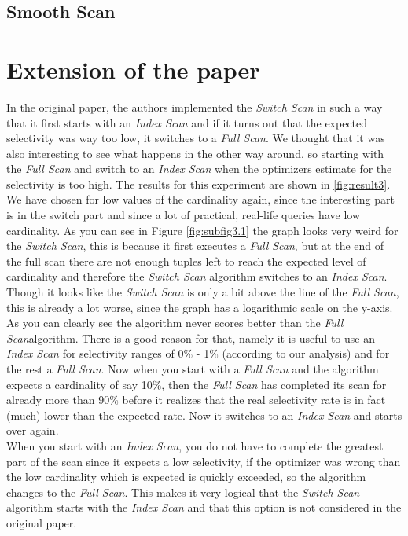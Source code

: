 \documentclass[a4paper,11pt,twoside]{article}
\begin{document}
\subsection{Smooth Scan}

\section{Extension of the paper}\label{sec:extension}
In the original paper, the authors implemented the \textit{Switch Scan} in such a way that it first starts with an \textit{Index Scan} and if it turns out that the expected selectivity was way too low, it switches to a \textit{Full Scan}. We thought that it was also interesting to see what happens in the other way around, so starting with the \textit{Full Scan} and switch to an \textit{Index Scan} when the optimizers estimate for the selectivity is too high. The results for this experiment are shown in \autoref{fig:result3}.\\
We have chosen for low values of the cardinality again, since the interesting part is in the switch part and since a lot of practical, real-life queries have low cardinality. As you can see in Figure \autoref{fig:subfig3.1} the graph looks very weird for the \textit{Switch Scan}, this is because it first executes a \textit{Full Scan}, but at the end of the full scan there are not enough tuples left to reach the expected level of cardinality and therefore the \textit{Switch Scan} algorithm switches to an \textit{Index Scan}. Though it looks like the \textit{Switch Scan} is only a bit above the line of the \textit{Full Scan}, this is already a lot worse, since the graph has a logarithmic scale on the y-axis. \\
As you can clearly see the algorithm never scores better than the \textit{Full Scan}algorithm. There is a good reason for that, namely it is useful to use an \textit{Index Scan} for selectivity ranges of 0$\%$ - 1$\%$ (according to our analysis) and for the rest a \textit{Full Scan}. Now when you start with a \textit{Full Scan} and the algorithm expects a cardinality of say 10$\%$, then the \textit{Full Scan} has completed its scan for already more than 90$\%$ before it realizes that the real selectivity rate is in fact (much) lower than the expected rate. Now it switches to an \textit{Index Scan} and starts over again. \\
When you start with an \textit{Index Scan}, you do not have to complete the greatest part of the scan since it expects a low selectivity, if the optimizer was wrong than the low cardinality which is expected is quickly exceeded, so the algorithm changes to the \textit{Full Scan}. This makes it very logical that the \textit{Switch Scan} algorithm starts with the \textit{Index Scan} and that this option is not considered in the original paper.
\end{document}
